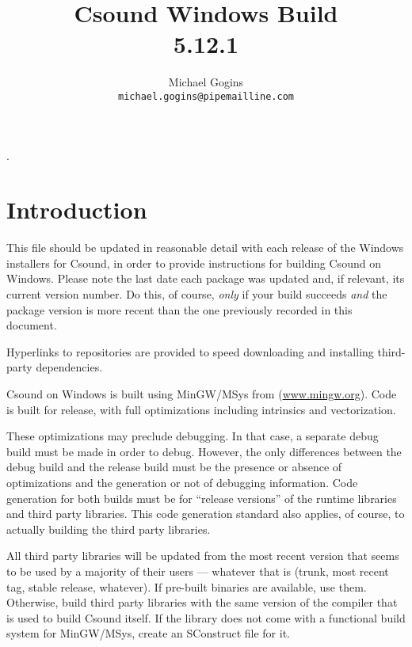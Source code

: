 \documentclass[11pt,letterpaper,onecolumn]{scrartcl}
\begin{document}
\begin{sloppypar}

.
\title{Csound Windows Build \\ 5.12.1}

\author{Michael Gogins \\ \texttt{michael.gogins@pipemailline.com}}
\maketitle

\section{Introduction}
\label{sec:Introduction}

This file should be updated in reasonable detail with each release of the Windows installers for Csound, in order to provide instructions for building Csound on Windows. Please note the last date each package was updated and, if relevant, its current version number. Do this, of course, \emph{only} if your build succeeds \emph{and} the package version is more recent than the one previously recorded in this document.

Hyperlinks to repositories are provided to speed downloading and installing third-party dependencies.

Csound on Windows is built using MinGW/MSys from (\url{www.mingw.org}). Code is built for release, with full optimizations including intrinsics and vectorization.  

These optimizations may preclude debugging. In that case, a separate debug build must be made in order to debug. However, the only differences between the debug build and the release build must be the presence or absence of optimizations and the generation or not of debugging information. Code generation for both builds must be for ``release versions'' of the runtime libraries and third party libraries. This code generation standard also applies, of course, to actually building the third party libraries.

All third party libraries will be updated from the most recent version that seems to be used by a majority of their users --- whatever that is (trunk, most recent tag, stable release, whatever). If pre-built binaries are available, use them. Otherwise, build third party libraries with the same version of the compiler that is used to build Csound itself. If the library does not come with a functional build system for MinGW/MSys, create an SConstruct file for it.


\end{sloppypar}
\end{document}
